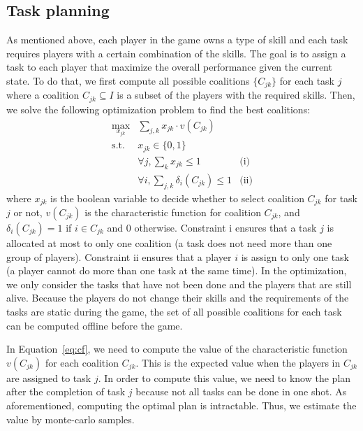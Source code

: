 \documentclass{aamas2014}
\begin{document}
\subsection{Task planning}
As mentioned above, each player in the game owns a type of skill
and each task requires players with a certain combination of the
skills. The goal is to assign a task to each player that maximize
the overall performance given the current state. To do that, we
first compute all possible coalitions $\{ C_{jk} \}$ for each task
$j$ where a coalition $C_{jk} \subseteq I$ is a subset of the
players with the required skills. Then, we solve the following
optimization problem to find the best coalitions:
\begin{equation}
  \begin{array}{lll}
    \max_{x_{jk}} & \sum_{j, k} x_{jk} \cdot v(C_{jk}) & \\
    \mbox{s.t.} & x_{jk} \in \{0, 1\} & \\
    & \forall j, \sum_{k} x_{jk} \leq 1 & \mbox{(i)} \\
    & \forall i, \sum_{j, k} \delta_i(C_{jk}) \leq 1 & \mbox{(ii)}
  \end{array}
  \label{eq:cf}
\end{equation}
where $x_{jk}$ is the boolean variable to decide whether to select
coalition $C_{jk}$ for task $j$ or not, $v(C_{jk})$ is the
characteristic function for coalition $C_{jk}$, and
$\delta_i(C_{jk}) = 1$ if $i\in C_{jk}$ and 0 otherwise. Constraint
i ensures that a task $j$ is allocated at most to only one
coalition (a task does not need more than one group of players).
Constraint ii ensures that a player $i$ is assign to only one task
(a player cannot do more than one task at the same time). In the
optimization, we only consider the tasks that have not been done
and the players that are still alive. Because the players do not
change their skills and the requirements of the tasks are static
during the game, the set of all possible coalitions for each task
can be computed offline before the game.

In Equation~\ref{eq:cf}, we need to compute the value of the
characteristic function $v(C_{jk})$ for each coalition $C_{jk}$.
This is the expected value when the players in $C_{jk}$ are
assigned to task $j$. In order to compute this value, we need to
know the plan after the completion of task $j$ because not all
tasks can be done in one shot. As aforementioned, computing the
optimal plan is intractable. Thus, we estimate the value by
monte-carlo samples.
\end{document}
